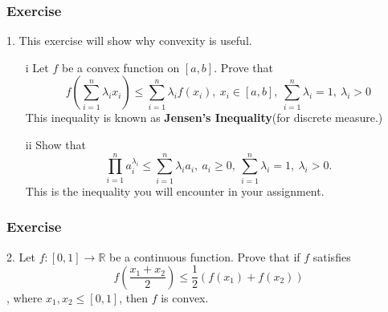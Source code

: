 \documentclass{beamer}
\begin{document}
\begin{frame}
    \frametitle{Exercise}
    1. This exercise will show why convexity is useful.
    \begin{enumerate}
        \item[i]    Let $f$ be a convex function on $[a,b]$. Prove that
            \begin{equation*}
                f(\sum^n_{i=1}\lambda_i x_i)\leq \sum^n_{i=1}\lambda_i f(x_i),\ x_i\in[a,b],\ \sum^n_{i=1}\lambda_i=1,\ \lambda_i>0
            \end{equation*}
            This inequality is known as \textbf{Jensen's Inequality}(for discrete measure.)
        \item[ii] Show that
            \begin{equation*}
                \prod^n_{i=1} a_i^{\lambda_i}\leq \sum^n_{i=1}\lambda_i a_i,\ a_i\geq 0,\ \sum^n_{i=1}\lambda_i=1,\ \lambda_i>0.
            \end{equation*}
            This is the inequality you will encounter in your assignment.
    \end{enumerate}
\end{frame}

\begin{frame}
    \frametitle{Exercise}
    2. Let $f:[0,1]\rightarrow\mathbb{R}$ be a continuous function. Prove that if $f$ satisfies
    \begin{equation*}
        f(\frac{x_1+x_2}{2})\leq \frac{1}{2}(f(x_1)+f(x_2))
    \end{equation*}
    , where $x_1,x_2\leq[0,1]$, then $f$ is convex.
\end{frame}
\end{document}
